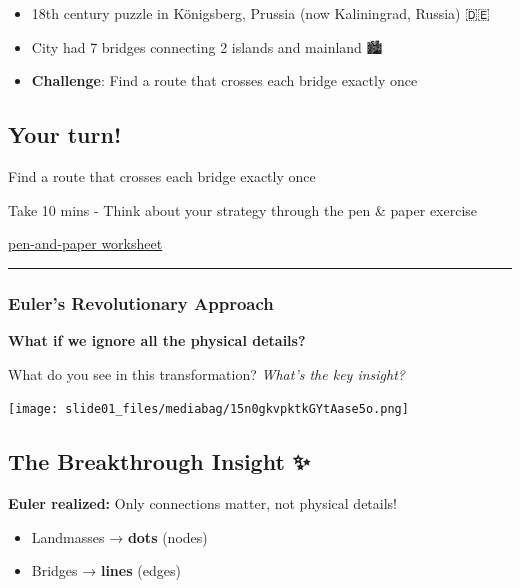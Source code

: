 \documentclass[
  letterpaper,
  DIV=11,
  numbers=noendperiod,
  oneside]{scrartcl}
\providecommand{\tightlist}{%
  \setlength{\itemsep}{0pt}\setlength{\parskip}{0pt}}
\begin{document}
\begin{itemize}
\tightlist
\item
  18th century puzzle in Königsberg, Prussia (now Kaliningrad, Russia)
  🇩🇪
\item
  City had 7 bridges connecting 2 islands and mainland 🏙️
\item
  \textbf{Challenge}: Find a route that crosses each bridge exactly once
  🚶‍♂️
\end{itemize}

\subsection{Your turn! 🧩}\label{your-turn}

Find a route that crosses each bridge exactly once

Take 10 mins - Think about your strategy through the pen \& paper
exercise

\href{http://estebanmoro.org/pdf/netsci_for_kids/the_konisberg_bridges.pdf}{pen-and-paper
worksheet}

\begin{center}\rule{0.5\linewidth}{0.5pt}\end{center}

\subsubsection{Euler's Revolutionary Approach
🧠}\label{eulers-revolutionary-approach}

\textbf{What if we ignore all the physical details? 🙂 }

What do you see in this transformation? \emph{What's the key insight?}

\begin{center}
\texttt{[image: slide01\_files/mediabag/15n0gkvpktkGYtAase5o.png]}
\end{center}

\subsection{The Breakthrough Insight ✨}\label{the-breakthrough-insight}

\textbf{Euler realized:} Only connections matter, not physical details!

\begin{itemize}
\tightlist
\item
  Landmasses → \textbf{dots} (nodes)
\item
  Bridges → \textbf{lines} (edges)
\end{itemize}
\end{document}
